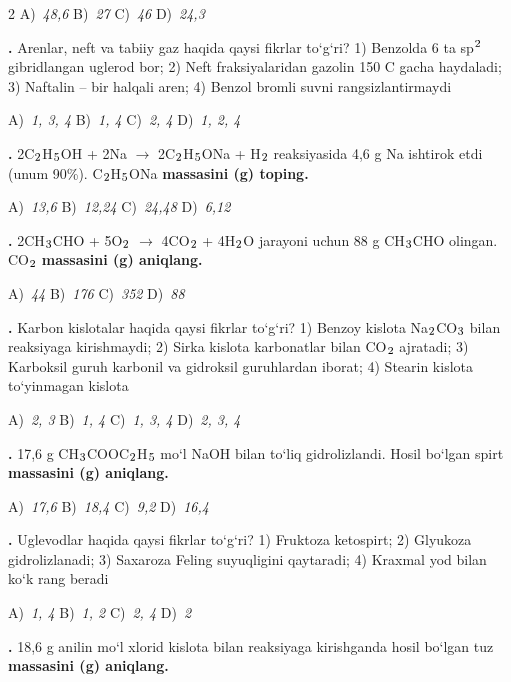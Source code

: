 \documentclass[11pt,a4paper]{article}
\renewcommand{\textsubscript}[1]{\ensuremath{_{\text{\fontsize{8}{8}\selectfont #1}}}}
\renewcommand{\textsuperscript}[1]{\ensuremath{^{\text{\fontsize{8}{8}\selectfont #1}}}}
\newcommand{\qn}[1]{\textbf{\fontsize{11.5}{13}\selectfont #1}}
\newcommand{\qsep}{\par\vspace{1pt}\noindent\rule{0pt}{0.4pt}\par\vspace{5pt}}
\begin{document}
\begin{multicols}{2}
\noindent A)~\textsl{48,6} \hfill B)~\textsl{27} \hfill C)~\textsl{46} \hfill D)~\textsl{24,3}\par
\qsep
\noindent\qn{22.} Arenlar, neft va tabiiy gaz haqida qaysi fikrlar to`g`ri? 1) Benzolda 6 ta sp\textsuperscript{2} gibridlangan uglerod bor; 2) Neft fraksiyalaridan gazolin 150 \textdegree{}C gacha haydaladi; 3) Naftalin -- bir halqali aren; 4) Benzol bromli suvni rangsizlantirmaydi

\noindent A)~\textsl{1, 3, 4} \hfill B)~\textsl{1, 4} \hfill C)~\textsl{2, 4} \hfill D)~\textsl{1, 2, 4}\par
\qsep
\noindent\qn{23.} 2C\textsubscript{2}H\textsubscript{5}OH + 2Na $\to$ 2C\textsubscript{2}H\textsubscript{5}ONa + H\textsubscript{2} reaksiyasida 4,6 g Na ishtirok etdi (unum 90\%). C\textsubscript{2}H\textsubscript{5}ONa \textbf{massasini (g) toping.}

\noindent A)~\textsl{13,6} \hfill B)~\textsl{12,24} \hfill C)~\textsl{24,48} \hfill D)~\textsl{6,12}\par
\qsep
\noindent\qn{24.} 2CH\textsubscript{3}CHO + 5O\textsubscript{2} $\to$ 4CO\textsubscript{2} + 4H\textsubscript{2}O jarayoni uchun 88 g CH\textsubscript{3}CHO olingan. CO\textsubscript{2} \textbf{massasini (g) aniqlang.}

\noindent A)~\textsl{44} \hfill B)~\textsl{176} \hfill C)~\textsl{352} \hfill D)~\textsl{88}\par
\qsep
\noindent\qn{25.} Karbon kislotalar haqida qaysi fikrlar to`g`ri? 1) Benzoy kislota Na\textsubscript{2}CO\textsubscript{3} bilan reaksiyaga kirishmaydi; 2) Sirka kislota karbonatlar bilan CO\textsubscript{2} ajratadi; 3) Karboksil guruh karbonil va gidroksil guruhlardan iborat; 4) Stearin kislota to`yinmagan kislota

\noindent A)~\textsl{2, 3} \hfill B)~\textsl{1, 4} \hfill C)~\textsl{1, 3, 4} \hfill D)~\textsl{2, 3, 4}\par
\qsep
\noindent\qn{26.} 17,6 g CH\textsubscript{3}COOC\textsubscript{2}H\textsubscript{5} mo`l NaOH bilan to`liq gidrolizlandi. Hosil bo`lgan spirt \textbf{massasini (g) aniqlang.}

\noindent A)~\textsl{17,6} \hfill B)~\textsl{18,4} \hfill C)~\textsl{9,2} \hfill D)~\textsl{16,4}\par
\qsep
\noindent\qn{27.} Uglevodlar haqida qaysi fikrlar to`g`ri? 1) Fruktoza ketospirt; 2) Glyukoza gidrolizlanadi; 3) Saxaroza Feling suyuqligini qaytaradi; 4) Kraxmal yod bilan ko`k rang beradi

\noindent A)~\textsl{1, 4} \hfill B)~\textsl{1, 2} \hfill C)~\textsl{2, 4} \hfill D)~\textsl{2}\par
\qsep
\noindent\qn{28.} 18,6 g anilin mo`l xlorid kislota bilan reaksiyaga kirishganda hosil bo`lgan tuz \textbf{massasini (g) aniqlang.}


\end{multicols}
\end{document}
